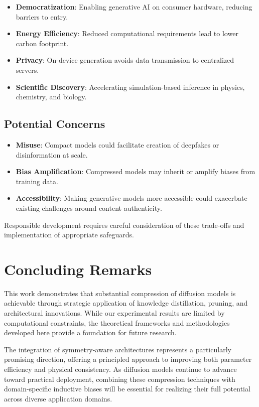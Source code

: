 \documentclass[12pt]{report}
\theoremstyle{definition}
\begin{document}
\begin{itemize}
\item \textbf{Democratization}: Enabling generative AI on consumer hardware, reducing barriers to entry.
\item \textbf{Energy Efficiency}: Reduced computational requirements lead to lower carbon footprint.
\item \textbf{Privacy}: On-device generation avoids data transmission to centralized servers.
\item \textbf{Scientific Discovery}: Accelerating simulation-based inference in physics, chemistry, and biology.
\end{itemize}

\subsection{Potential Concerns}

\begin{itemize}
\item \textbf{Misuse}: Compact models could facilitate creation of deepfakes or disinformation at scale.
\item \textbf{Bias Amplification}: Compressed models may inherit or amplify biases from training data.
\item \textbf{Accessibility}: Making generative models more accessible could exacerbate existing challenges around content authenticity.
\end{itemize}

Responsible development requires careful consideration of these trade-offs and implementation of appropriate safeguards.

\section{Concluding Remarks}

This work demonstrates that substantial compression of diffusion models is achievable through strategic application of knowledge distillation, pruning, and architectural innovations. While our experimental results are limited by computational constraints, the theoretical frameworks and methodologies developed here provide a foundation for future research.

The integration of symmetry-aware architectures represents a particularly promising direction, offering a principled approach to improving both parameter efficiency and physical consistency. As diffusion models continue to advance toward practical deployment, combining these compression techniques with domain-specific inductive biases will be essential for realizing their full potential across diverse application domains.
\end{document}
